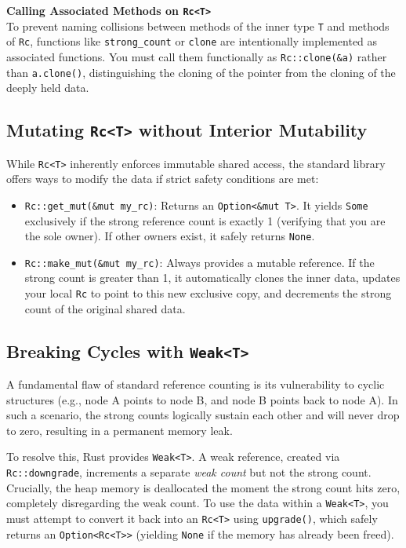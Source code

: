 \begin{warningbox}
\textbf{Calling Associated Methods on \texttt{Rc<T>}} \\
To prevent naming collisions between methods of the inner type \texttt{T} and methods of \texttt{Rc}, functions like \texttt{strong\_count} or \texttt{clone} are intentionally implemented as associated functions. You must call them functionally as \texttt{Rc::clone(\&a)} rather than \texttt{a.clone()}, distinguishing the cloning of the pointer from the cloning of the deeply held data.
\end{warningbox}

\subsection{Mutating \texttt{Rc<T>} without Interior Mutability}
While \texttt{Rc<T>} inherently enforces immutable shared access, the standard library offers ways to modify the data if strict safety conditions are met:
\begin{itemize}
    \item \texttt{Rc::get\_mut(\&mut my\_rc)}: Returns an \texttt{Option<\&mut T>}. It yields \texttt{Some} exclusively if the strong reference count is exactly 1 (verifying that you are the sole owner). If other owners exist, it safely returns \texttt{None}.
    \item \texttt{Rc::make\_mut(\&mut my\_rc)}: Always provides a mutable reference. If the strong count is greater than 1, it automatically clones the inner data, updates your local \texttt{Rc} to point to this new exclusive copy, and decrements the strong count of the original shared data.
\end{itemize}

\subsection{Breaking Cycles with \texttt{Weak<T>}}
A fundamental flaw of standard reference counting is its vulnerability to cyclic structures (e.g., node A points to node B, and node B points back to node A). In such a scenario, the strong counts logically sustain each other and will never drop to zero, resulting in a permanent memory leak.

To resolve this, Rust provides \texttt{Weak<T>}. A weak reference, created via \texttt{Rc::downgrade}, increments a separate \textit{weak count} but not the strong count. Crucially, the heap memory is deallocated the moment the strong count hits zero, completely disregarding the weak count. To use the data within a \texttt{Weak<T>}, you must attempt to convert it back into an \texttt{Rc<T>} using \texttt{upgrade()}, which safely returns an \texttt{Option<Rc<T>>} (yielding \texttt{None} if the memory has already been freed).


